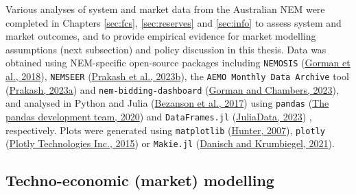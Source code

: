 \documentclass[12pt,a4paper,]{report}
\begin{document}
Various analyses of system and market data from the Australian NEM were
completed in Chapters \ref{sec:fcs}, \ref{sec:reserves} and
\ref{sec:info} to assess system and market outcomes, and to provide
empirical evidence for market modelling assumptions (next subsection)
and policy discussion in this thesis. Data was obtained using
NEM-specific open-source packages including \texttt{NEMOSIS}
(\protect\hyperlink{ref-gormanNEMOSISNEMOpen2018}{Gorman et al., 2018}),
\texttt{NEMSEER}
(\protect\hyperlink{ref-prakashNEMSEERPythonPackage2023}{Prakash et al.,
2023b}), the \texttt{AEMO\ Monthly\ Data\ Archive} tool
(\protect\hyperlink{ref-prakashAEMOMonthlyData2023}{Prakash, 2023a}) and
\texttt{nem-bidding-dashboard}
(\protect\hyperlink{ref-gormanNembiddingdashboard2023}{Gorman and
Chambers, 2023}), and analysed in Python and Julia
(\protect\hyperlink{ref-bezansonJuliaFreshApproach2017}{Bezanson et al.,
2017}) using \texttt{pandas}
(\protect\hyperlink{ref-reback2020pandas}{The pandas development team,
2020}) and \texttt{DataFrames.jl}
(\protect\hyperlink{ref-juliadataDataFramesJl2023}{JuliaData, 2023}) ,
respectively. Plots were generated using \texttt{matplotlib}
(\protect\hyperlink{ref-hunterMatplotlib2DGraphics2007}{Hunter, 2007}),
\texttt{plotly}
(\protect\hyperlink{ref-plotlytechnologiesinc.CollaborativeDataScience2015}{Plotly
Technologies Inc., 2015}) or \texttt{Makie.jl}
(\protect\hyperlink{ref-danischMakieJlFlexible2021}{Danisch and
Krumbiegel, 2021}).

\hypertarget{techno-economic-market-modelling}{%
\subsection{Techno-economic (market)
modelling}\label{techno-economic-market-modelling}}
\end{document}
